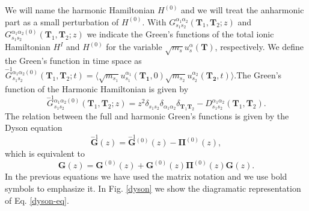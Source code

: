 We will name the harmonic Hamiltonian $H^{(0)}$ and we will treat the anharmonic part as a small perturbation of $H^{(0)}$. With $G_{s_{1}s_{2}}^{\alpha_{1}\alpha_{2}}(\mathbf{T}_{1},\mathbf{T}_{2};z)$ and 
$G_{s_{1}s_{2}}^{\alpha_{1}\alpha_{2}(0)}(\mathbf{T}_{1},\mathbf{T}_{2};z)$ we indicate the Green's functions of the total ionic Hamiltonian $H^{I}$ and $H^{(0)}$ for the variable $\sqrt{m_{s}}u_{s}^{\alpha}(\mathbf{T})$, 
respectively. We define the Green's function in time space as $\overset{-1}{G}{}_{s_{1}s_{2}}^{\alpha_{1}\alpha_{2}(0)}(\mathbf{T}_{1},\mathbf{T}_{2};t)=\langle\sqrt{m_{s_{1}}}u_{s_{1}}^{\alpha_{1}}(\mathbf{T_{1}},0)\sqrt{m_{s_{2}}}u_{s_{2}}^{\alpha_{2}}(\mathbf{T_{2}},t)\rangle$.The Green's function of the Harmonic Hamiltonian is given by
\begin{equation}
 \overset{-1}{G}{}_{s_{1}s_{2}}^{\alpha_{1}\alpha_{2}(0)}(\mathbf{T}_{1},\mathbf{T}_{2};z)=z^{2}\delta_{s_{1}s_{2}}\delta_{\alpha_{1}\alpha_{2}}\delta_{\mathbf{T}_{1}\mathbf{T}_{2}}-D_{s_{1}s_{2}}^{\alpha_{1}\alpha_{2}}(\mathbf{
 T}_{1},\mathbf{T}_{2}).
\end{equation}
The relation between the full and harmonic Green's functions is given by the Dyson equation
\begin{equation}
 \label{green-function}
 \overset{-1}{\mathbf{G}}(z)=\overset{-1}{\mathbf{G}}{}^{(0)}(z)-\boldsymbol{\Pi}^{(0)}(z),
\end{equation}
which is equivalent to
\begin{equation}
 \label{dyson-eq}
 \mathbf{G}(z)=\mathbf{G}^{(0)}(z)+\mathbf{G}^{(0)}(z)\boldsymbol{\Pi}^{(0)}(z)\mathbf{G}(z).
\end{equation}
In the previous equations we have used the matrix notation and we use bold symbols to emphasize it. In Fig. \ref{dyson} we show the diagramatic representation of Eq. \ref{dyson-eq}. 
